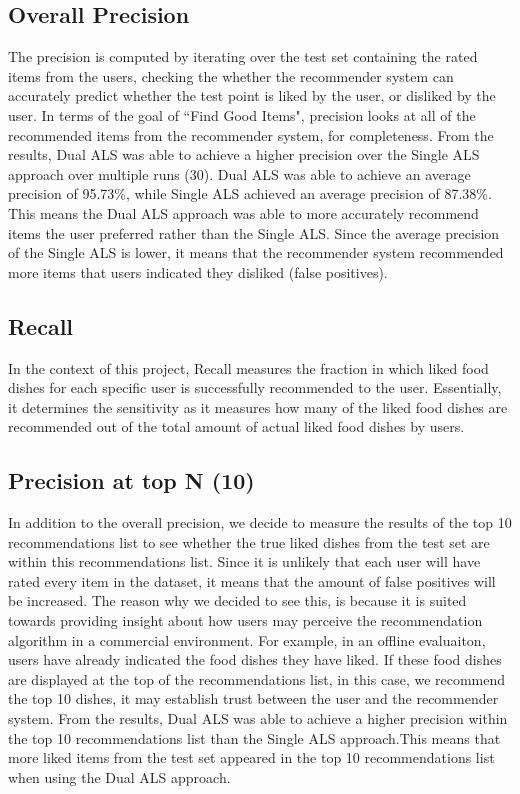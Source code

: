 \subsection{Overall Precision}
The precision is computed by iterating over the test set containing the rated items from the users, checking the whether the recommender system can accurately predict whether the test point is liked by the user, or disliked by the user. In terms of the goal of ``Find Good Items", precision looks at all of the recommended items from the recommender system, for completeness. From the results, Dual ALS was able to achieve a higher precision over the Single ALS approach over multiple runs (30). Dual ALS was able to achieve an average precision of 95.73\%, while Single ALS achieved an average precision of 87.38\%. This means the Dual ALS approach was able to more accurately recommend items the user preferred rather than the Single ALS. Since the average precision of the Single ALS is lower, it means that the recommender system recommended more items that users indicated they disliked (false positives).

\subsection{Recall}
In the context of this project, Recall measures the fraction in which liked food dishes for each specific user is successfully recommended to the user. Essentially, it determines the sensitivity as it measures how many of the liked food dishes are recommended out of the total amount of actual liked food dishes by users.  

\subsection{Precision at top N (10)}
In addition to the overall precision, we decide to measure the results of the top 10 recommendations list to see whether the true liked dishes from the test set are within this recommendations list. Since it is unlikely that each user will have rated every item in the dataset, it means that the amount of false positives will be increased. The reason why we decided to see this, is because it is suited towards providing insight about how users may perceive the recommendation algorithm in a commercial environment. For example, in an offline evaluaiton, users have already indicated the food dishes they have liked. If these food dishes are displayed at the top of the recommendations list, in this case, we recommend the top 10 dishes, it may establish trust between the user and the recommender system. From the results, Dual ALS was able to achieve a higher precision within the top 10 recommendations list than the Single ALS approach.This means that more liked items from the test set appeared in the top 10 recommendations list when using the Dual ALS approach.    

